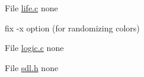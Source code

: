
\begin{DoxyRefList}
\item[File \mbox{\hyperlink{life_8c}{life.c}} ]\label{todo__todo000001}%
%
none 

\label{todo__todo000002}%
%
fix -\/x option (for randomizing colors) 
\item[File \mbox{\hyperlink{logic_8c}{logic.c}} ]\label{todo__todo000003}%
%
none 
\item[File \mbox{\hyperlink{sdl_8h}{sdl.h}} ]\label{todo__todo000004}%
%
none
\end{DoxyRefList}
